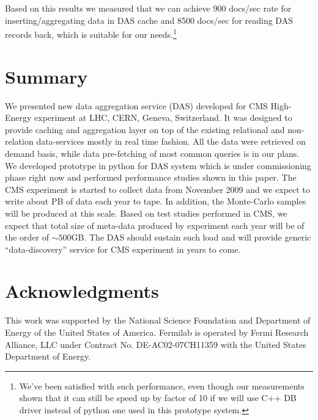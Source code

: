 \documentclass[a4paper]{jpconf}
\begin{document}
Based on this results we measured that we can achieve 900 docs/sec rate
for inserting/aggregating data in DAS cache and 8500 docs/sec for reading 
DAS records back, which is suitable for our
needs.\footnote{We've been satisfied with such performance,
even though our measurements shown that it can still be speed up by factor of
10 if we will use C++ DB driver instead of python one used in this prototype system.}

\section{Summary}
We presented new data aggregation service (DAS) developed for CMS High-Energy experiment
at LHC, CERN, Geneva, Switzerland. It was designed to provide caching and
aggregation layer on top of the existing relational and non-relation data-services
mostly in real time fashion. All the data were retrieved on demand basis,
while data pre-fetching of most common queries is in our plans. We developed
prototype in python for DAS system which is under commissioning phase right now 
and performed performance studies shown in this paper. 
The CMS experiment is started to
collect data from November 2009 and we expect to write about PB of data each
year to tape. In addition, the Monte-Carlo samples will be produced at this scale.
Based on test studies performed in CMS, we expect that total size of
meta-data produced by experiment each year will be of the order of
$\sim500$GB. The DAS should sustain such load and will provide generic 
``data-discovery'' service for CMS experiment in years to come.

\section{Acknowledgments}

This work was supported by the National Science Foundation and Department of Energy of the United States of America. Fermilab is operated by Fermi Research Alliance, LLC under Contract
No. DE-AC02-07CH11359 with the United States Department of Energy.
\end{document}
